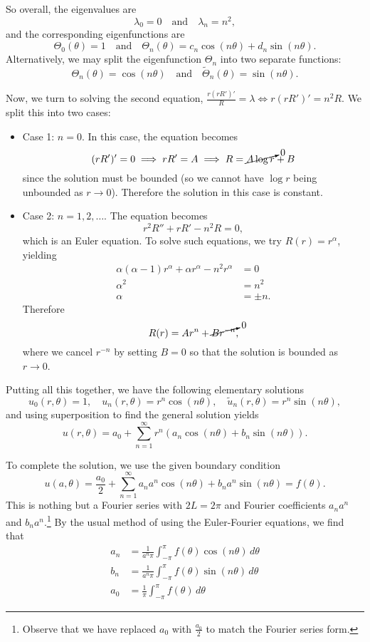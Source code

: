 \begin{enumerate}
	So overall, the eigenvalues are
	\[
	\lambda_0 = 0 \quad \text{and} \quad \lambda_n = n^2,
	\]
	and the corresponding eigenfunctions are
	\[
	\Theta_0(\theta) = 1 \quad \text{and} \quad \Theta_n(\theta) = c_n\cos(n\theta) + d_n\sin(n\theta).
	\]
	Alternatively, we may split the eigenfunction $\Theta_n$ into two separate functions:
	\[
	\Theta_n(\theta) = \cos(n\theta) \quad \text{and} \quad \widetilde{\Theta}_n(\theta) = \sin(n\theta).
	\]
	
	Now, we turn to solving the second equation, $\frac{r(rR')'}{R} = \lambda \iff r(rR')' = n^2R$. We split this into two cases:
	\begin{itemize}
		\item Case 1: $n=0$. In this case, the equation becomes
		\[
		(rR')' = 0 \implies rR' = A \implies R = \cancelto{0}{A\log r} + B
		\]
		since the solution must be bounded (so we cannot have $\log r$ being unbounded as $r \to 0$). Therefore the solution in this case is constant.
		\item Case 2: $n = 1, 2, \dots$. The equation becomes
		\[
		r^2R'' + rR' - n^2R = 0,
		\]
		which is an Euler equation. To solve such equations, we try $R(r) = r^{\alpha}$, yielding
		\begin{align*}
			\alpha(\alpha-1)r^{\alpha} + \alpha r^{\alpha} - n^2r^{\alpha} &= 0 \\
			\alpha^2 &= n^2 \\
			\alpha &= \pm n.
		\end{align*}
		Therefore
		\[
		R(r) = Ar^n + \cancelto{0}{Br^{-n}},
		\]
		where we cancel $r^{-n}$ by setting $B=0$ so that the solution is bounded as $r\to 0$.
	\end{itemize}
	Putting all this together, we have the following elementary solutions
	\[
	u_0(r,\theta) = 1, \quad u_n(r,\theta) = r^n\cos(n\theta), \quad \widetilde{u}_n(r,\theta) = r^n\sin(n\theta),
	\]
	and using superposition to find the general solution yields
	\begin{equation}\label{eq:laprectgensol}
		u(r,\theta) = a_0 + \sum_{n=1}^{\infty} r^n\left(a_n\cos(n\theta) + b_n\sin(n\theta)\right).
	\end{equation}
	
	To complete the solution, we use the given boundary condition 
	\[
	u(a, \theta) = \frac{a_0}{2} + \sum_{n=1}^{\infty} a_na^n \cos(n\theta) + b_na^n \sin(n\theta) = f(\theta).
	\]
	This is nothing but a Fourier series with $2L = 2\pi$ and Fourier coefficients $a_na^n$ and $b_na^n$.\footnote{Observe that we have replaced $a_0$ with $\frac{a_0}{2}$ to match the Fourier series form.} By the usual method of using the Euler-Fourier equations, we find that
	\begin{align}
		\label{eq:lapdisccoeff1}
		a_n &= \frac{1}{a^n\pi} \int_{-\pi}^{\pi} f(\theta) \cos(n\theta) \,d\theta \\
		\label{eq:lapdisccoeff2}
		b_n &= \frac{1}{a^n\pi} \int_{-\pi}^{\pi} f(\theta) \sin(n\theta) \,d\theta \\
		a_0 &= \frac{1}{\pi} \int_{-\pi}^{\pi} f(\theta) \,d\theta
	\end{align}
	

\end{enumerate}
